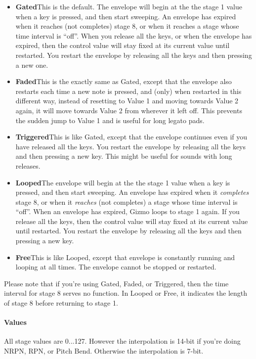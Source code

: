 \documentclass{article}
\begin{document}
\begin{itemize}
\item {\bf Gated}\quad This is the default.  The envelope will begin at the the stage 1 value when a key is pressed, and then start sweeping.  An envelope has expired when it reaches (not completes) stage 8, or when it reaches a stage whose time interval is ``off''.  When you release all the keys, or when the envelope has expired, then the control value will stay fixed at its current value until restarted.  You restart the envelope by releasing all the keys and then pressing a new one. 
\item {\bf Faded}\quad This is the exactly same as Gated, except that the envelope also restarts each time a new note is pressed, and (only) when restarted in this different way, instead of resetting to Value 1 and moving towards Value 2 again, it will move towards Value 2 from wherever it left off.  This prevents the sudden jump to Value 1 and is useful for long legato pads.
\item {\bf Triggered}\quad This is like Gated, except that the envelope continues even if you have released all the keys.  You restart the envelope by releasing all the keys and then pressing a new key.  This might be useful for sounds with long releases.
\item {\bf Looped}\quad The envelope will begin at the the stage 1 value when a key is pressed, and then start sweeping.  An envelope has expired when it {\it completes} stage 8, or when it {\it reaches} (not completes) a stage whose time interval is ``off''.  When an envelope has expired, Gizmo loops to stage 1 again.  If you release all the keys, then the control value will stay fixed at its current value until restarted.  You restart the envelope by releasing all the keys and then pressing a new key.
\item {\bf Free}\quad This is like Looped, except that envelope is constantly running and looping at all times.  The envelope cannot be stopped or restarted.
\end{itemize}

Please note that if you're using Gated, Faded, or Triggered, then the time interval for stage 8 serves no function.  In Looped or Free, it indicates the length of stage 8 before returning to stage 1.  

\paragraph{Values}  All stage values are 0...127.  However the interpolation is 14-bit if you're doing NRPN, RPN, %
or Pitch Bend.  Otherwise the interpolation is 7-bit.
\end{document}
